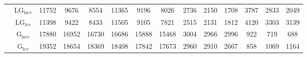 \begin{table}[!ht]
{\begin{tabular}{@{}cc|ccc|ccc|ccc|ccc@{}}
 & $\mathrm{LG}_{\mathrm{lscv}}$ & 11752 & 9676 & 8554 & 11365 & 9196 & 8026 & 2736 & 2150 & 1708 & 3787 & 2833 & 2049 \\ 
 & $\mathrm{LG}_{\mathrm{lcv}}$ & 11398 & 9422 & 8433 & 11505 & 9105 & 7821 & 2515 & 2131 & 1812 & 4120 & 3303 & 3139 \\ 
 & $\mathrm{G}_{\mathrm{lscv}}$ & 17880 & 16952 & 16730 & 16686 & 15888 & 15468 & 3004 & 2966 & 2996 & \cellcolor{black!10}922 & \cellcolor{black!30}719 & \cellcolor{black!30}688 \\ 
 & $\mathrm{G}_{\mathrm{lcv}}$ & 19352 & 18654 & 18369 & 18408 & 17842 & 17673 & 2960 & 2910 & 2667 & \cellcolor{black!30}858 & \cellcolor{black!10}1069 & \cellcolor{black!10}1164 \\ 
\bottomrule
\end{tabular}}
\end{table}
